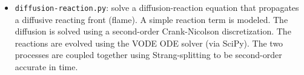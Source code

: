\begin{itemize}
\begin{itemize}
  \item {\tt diffusion-reaction.py}: solve a diffusion-reaction
    equation that propagates a diffusive reacting front (flame).  A
    simple reaction term is modeled.  The diffusion is solved using
    a second-order Crank-Nicolson discretization.  The reactions
    are evolved using the VODE ODE solver (via SciPy).  The two
    processes are coupled together using Strang-splitting to be
    second-order accurate in time.
     

  \end{itemize}

\end{itemize}


